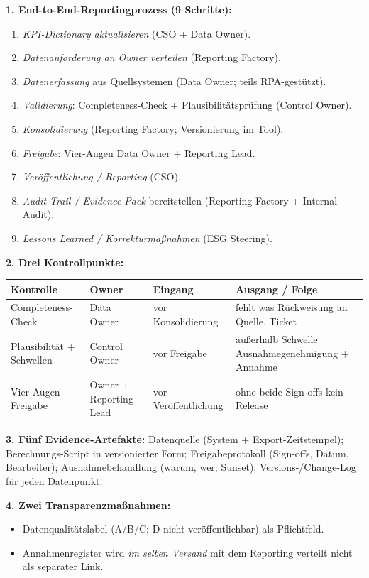 \documentclass[11pt,a4paper,oneside]{article}
\begin{document}
\begin{loesungbox}
\textbf{1. End-to-End-Reportingprozess (9 Schritte):}
\begin{enumerate}
  \item \emph{KPI-Dictionary aktualisieren} (CSO + Data Owner).
  \item \emph{Datenanforderung an Owner verteilen} (Reporting Factory).
  \item \emph{Datenerfassung} aus Quellsystemen (Data Owner; teils RPA-gest\"utzt).
  \item \emph{Validierung}: Completeness-Check + Plausibilit\"atspr\"ufung (Control Owner).
  \item \emph{Konsolidierung} (Reporting Factory; Versionierung im Tool).
  \item \emph{Freigabe}: Vier-Augen Data Owner + Reporting Lead.
  \item \emph{Ver\"offentlichung / Reporting} (CSO).
  \item \emph{Audit Trail / Evidence Pack} bereitstellen (Reporting Factory + Internal Audit).
  \item \emph{Lessons Learned / Korrekturma{\ss}nahmen} (ESG Steering).
\end{enumerate}

\smallskip
\textbf{2. Drei Kontrollpunkte:}

\smallskip
\begin{tabularx}{\linewidth}{@{}p{3.4cm}p{3.2cm}p{2.6cm}X@{}}
\toprule
\textbf{Kontrolle} & \textbf{Owner} & \textbf{Eingang} & \textbf{Ausgang / Folge} \\
\midrule
Completeness-Check       & Data Owner       & vor Konsolidierung & fehlt was \textrightarrow{} R\"uckweisung an Quelle, Ticket \\
Plausibilit\"at + Schwellen & Control Owner & vor Freigabe        & au{\ss}erhalb Schwelle \textrightarrow{} Ausnahmegenehmigung + Annahme \\
Vier-Augen-Freigabe      & Owner + Reporting Lead & vor Ver\"offentlichung & ohne beide Sign-offs kein Release \\
\bottomrule
\end{tabularx}

\smallskip
\textbf{3. F\"unf Evidence-Artefakte:} Datenquelle (System + Export-Zeitstempel); Berechnungs-Script in versionierter Form; Freigabeprotokoll (Sign-offs, Datum, Bearbeiter); Ausnahmebehandlung (warum, wer, Sunset); Versions-/Change-Log f\"ur jeden Datenpunkt.

\smallskip
\textbf{4. Zwei Transparenzma{\ss}nahmen:}
\begin{itemize}
  \item Datenqualit\"atslabel (A/B/C; D nicht ver\"offentlichbar) als Pflichtfeld.
  \item Annahmenregister wird \emph{im selben Versand} mit dem Reporting verteilt \textendash{} nicht als separater Link.
\end{itemize}


\end{loesungbox}
\end{document}
